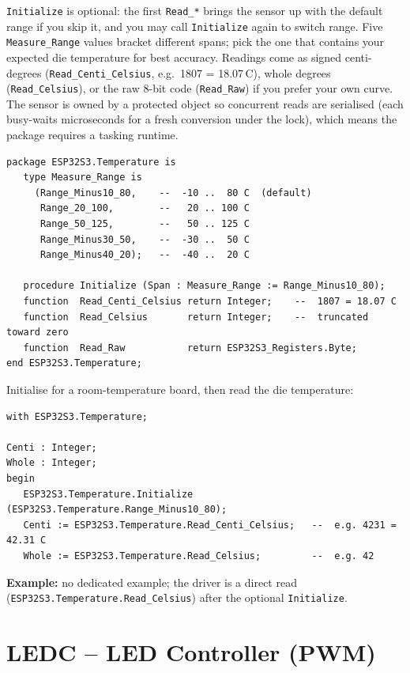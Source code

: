 \texttt{Initialize} is optional: the first \texttt{Read\_*} brings the sensor up
with the default range if you skip it, and you may call \texttt{Initialize}
again to switch range. Five \texttt{Measure\_Range} values bracket different
spans; pick the one that contains your expected die temperature for best
accuracy. Readings come as signed centi-degrees
(\texttt{Read\_Centi\_Celsius}, e.g.\ 1807 = 18.07\,\textdegree C), whole degrees
(\texttt{Read\_Celsius}), or the raw 8-bit code (\texttt{Read\_Raw}) if you
prefer your own curve. The sensor is owned by a protected object so concurrent
reads are serialised (each busy-waits microseconds for a fresh conversion under
the lock), which means the package requires a tasking runtime.

\begin{lstlisting}
package ESP32S3.Temperature is
   type Measure_Range is
     (Range_Minus10_80,    --  -10 ..  80 C  (default)
      Range_20_100,        --   20 .. 100 C
      Range_50_125,        --   50 .. 125 C
      Range_Minus30_50,    --  -30 ..  50 C
      Range_Minus40_20);   --  -40 ..  20 C

   procedure Initialize (Span : Measure_Range := Range_Minus10_80);
   function  Read_Centi_Celsius return Integer;    --  1807 = 18.07 C
   function  Read_Celsius       return Integer;    --  truncated toward zero
   function  Read_Raw           return ESP32S3_Registers.Byte;
end ESP32S3.Temperature;
\end{lstlisting}

Initialise for a room-temperature board, then read the die temperature:

\begin{lstlisting}
with ESP32S3.Temperature;

Centi : Integer;
Whole : Integer;
begin
   ESP32S3.Temperature.Initialize (ESP32S3.Temperature.Range_Minus10_80);
   Centi := ESP32S3.Temperature.Read_Centi_Celsius;   --  e.g. 4231 = 42.31 C
   Whole := ESP32S3.Temperature.Read_Celsius;         --  e.g. 42
\end{lstlisting}

\noindent\textbf{Example:} no dedicated example; the driver is a direct read
(\texttt{ESP32S3.Temperature.Read\_Celsius}) after the optional
\texttt{Initialize}.

\section{LEDC -- LED Controller (PWM)}
\label{app:int:ledc}

